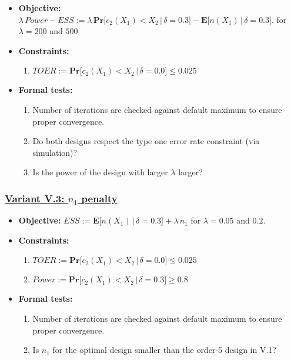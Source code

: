 \documentclass[]{book}
\providecommand{\tightlist}{%
  \setlength{\itemsep}{0pt}\setlength{\parskip}{0pt}}
\begin{document}
\begin{itemize}
\tightlist
\item
  \textbf{Objective:} \(\lambda\, Power - ESS := \lambda\, \boldsymbol{Pr}\big[c_2(X_1) < X_2\,|\,\delta=0.3\big] - \boldsymbol{E}\big[n(X_1)\,|\,\delta=0.3\big].\)
  for \(\lambda = 200\) and \(500\)
\item
  \textbf{Constraints:}

  \begin{enumerate}
  \def\labelenumi{\arabic{enumi}.}
  \tightlist
  \item
    \(TOER := \boldsymbol{Pr}\big[c_2(X_1) < X_2\,|\,\delta=0.0\big] \leq 0.025\)
  \end{enumerate}
\item
  \textbf{Formal tests:}

  \begin{enumerate}
  \def\labelenumi{\arabic{enumi}.}
  \tightlist
  \item
    Number of iterations are checked against default maximum to ensure proper
    convergence.
  \item
    Do both designs respect the type one error rate constraint (via simulation)?
  \item
    Is the power of the design with larger \(\lambda\) larger?
  \end{enumerate}
\end{itemize}

\hypertarget{variant-v.3-n_1-penalty}{%
\subsubsection{\texorpdfstring{\protect\hyperlink{variantV_3}{Variant V.3: \(n_1\) penalty}}{Variant V.3: n\_1 penalty}}\label{variant-v.3-n_1-penalty}}

\begin{itemize}
\tightlist
\item
  \textbf{Objective:} \(ESS := \boldsymbol{E}\big[n(X_1)\,|\,\delta=0.3\big] + \lambda \, n_1\)
  for \(\lambda = 0.05\) and \(0.2\).
\item
  \textbf{Constraints:}

  \begin{enumerate}
  \def\labelenumi{\arabic{enumi}.}
  \tightlist
  \item
    \(TOER := \boldsymbol{Pr}\big[c_2(X_1) < X_2\,|\,\delta=0.0\big] \leq 0.025\)
  \item
    \(Power := \boldsymbol{Pr}\big[c_2(X_1) < X_2\,|\,\delta=0.3\big] \geq 0.8\)
  \end{enumerate}
\item
  \textbf{Formal tests:}

  \begin{enumerate}
  \def\labelenumi{\arabic{enumi}.}
  \tightlist
  \item
    Number of iterations are checked against default maximum to ensure proper
    convergence.
  \item
    Is \(n_1\) for the optimal design smaller than the order-5 design in V.1?
  \end{enumerate}
\end{itemize}
\end{document}
